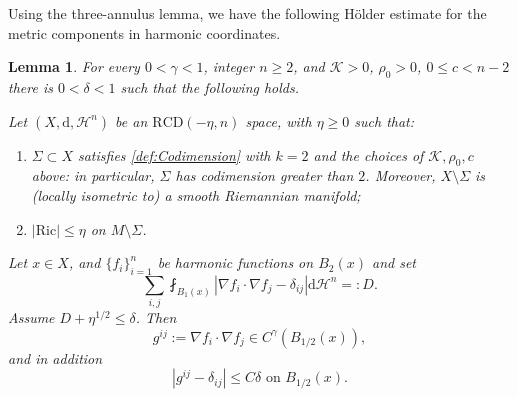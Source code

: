 \documentclass[12pt,a4paper,reqno]{amsart}
\newtheorem{lemma}[theorem]{Lemma}
\renewcommand{\leq}{\leqslant}
\renewcommand{\geq}{\geqslant}
\begin{document}
Using the three-annulus lemma, we have the following H\"older estimate for the metric components in harmonic coordinates. 
\begin{lemma}\label{lemmaholder}
For every $0<\gamma<1$, integer $n\geq 2$, and $\mathcal{K}>0$, $\rho_0>0$, $0\leq c<n-2$ there is $0<\delta<1$ such that the following holds. 

    Let $(X,\mathrm{d},\mathcal{H}^n)$ be an $\mathrm{RCD}(-\eta,n)$ space, with $\eta\geq 0$ such that:
    \begin{enumerate}
        \item $\Sigma \subset X$ satisfies \cref{def:Codimension} with $k=2$ and the choices of $\mathcal{K},\rho_0,c$ above: in particular, $\Sigma$ has codimension greater than $2$. Moreover, $X\setminus\Sigma$ is (locally isometric to) a smooth Riemannian manifold;
        \item $|\mathrm{Ric}| \leq \eta$ on $M\setminus \Sigma$.
    \end{enumerate} 
    Let $x\in X$, and $\{f_i\}_{i=1}^n$ be harmonic functions on $B_2(x)$ and set 
    \[ 
    \sum_{i,j} \fint_{B_1(x)} |\nabla f_i \cdot \nabla f_j - \delta_{ij}|\mathrm{d}\mathcal{H}^n =: D.
    \]
    Assume $D+\eta^{1/2}\leq \delta$. Then 
    \[
    g^{ij}:=\nabla f_i\cdot \nabla f_j \in C^\gamma(B_{1/2}(x)),
    \]
    and in addition
    \[ |g^{ij} - \delta_{ij}| \leq C\delta \text{ on } B_{1/2}(x). \]
\end{lemma}
\end{document}
